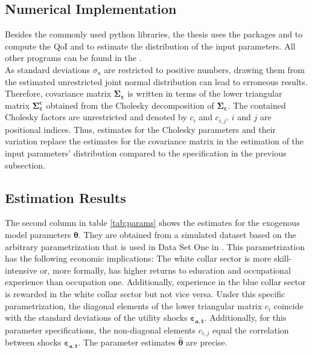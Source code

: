 \subsection{Numerical Implementation}

Besides the commonly used python libraries, the thesis uses the packages  and  to compute the QoI and to estimate the distribution of the input parameters. All other programs can be found in the  .\\

\noindent
As standard deviations $\sigma_{a}$ are restricted to positive numbers, drawing them from the estimated unrestricted joint normal distribution can lead to erroneous results. Therefore, covariance matrix $\pmb{\Sigma_\varepsilon}$ is written in terms of the lower triangular matrix $\pmb{\Sigma_\varepsilon^c}$ obtained from the Cholesky decomposition of $\pmb{\Sigma_\varepsilon}$. The contained Cholesky factors are unrestricted and denoted by $c_{i}$ and $c_{i,j}$. $i$ and $j$ are positional indices. Thus, estimates for the Cholesky parameters and their variation replace the estimates for the covariance matrix in the estimation of the input parameters' distribution compared to the specification in the previous subsection.

\subsection{Estimation Results}
The second column in table \ref{tab:params} shows the estimates for the exogenous model parameters $\pmb{\theta}$. They are obtained from a simulated dataset based on the arbitrary parametrization that is used in Data Set One in \cite{Keane.1994}. 
This parametrization has the following economic implications: The white collar sector is more skill-intensive or, more formally, has higher returns to education and occupational experience than occupation one. Additionally, experience in the blue collar sector is rewarded in the white collar sector but not vice versa.
Under this specific parametrization, the diagonal elements of the lower triangular matrix $c_{i}$ coincide with the standard deviations of the utility shocks $\pmb{\varepsilon_{a,t}}$. Additionally, for this parameter specifications, the non-diagonal elements $c_{i,j}$ equal the correlation between shocks $\pmb{\varepsilon_{a,t}}$.
The parameter estimates $\pmb{\hat{\theta}}$ are precise.\\

